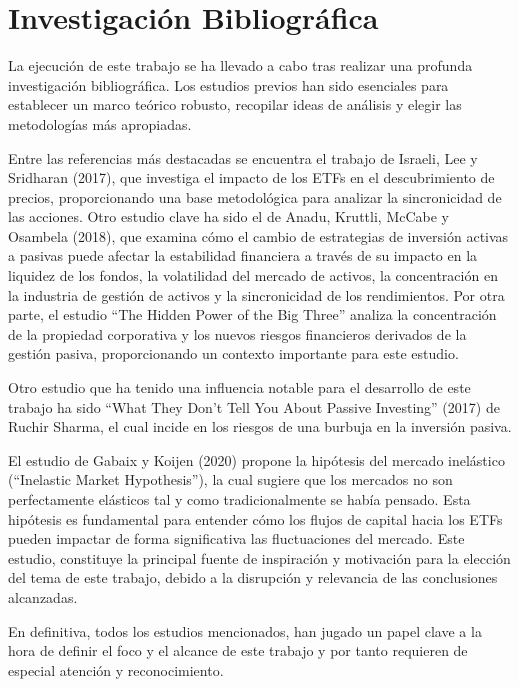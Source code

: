 \documentclass[12pt,a4paper]{article}
\begin{document}
\newpage

\section*{Investigación Bibliográfica}

La ejecución de este trabajo se ha llevado a cabo tras realizar una profunda investigación bibliográfica. Los estudios previos han sido esenciales para establecer un marco teórico robusto, recopilar ideas de análisis y elegir las metodologías más apropiadas.

Entre las referencias más destacadas se encuentra el trabajo de Israeli, Lee y Sridharan (2017), que investiga el impacto de los ETFs en el descubrimiento de precios, proporcionando una base metodológica para analizar la sincronicidad de las acciones. Otro estudio clave ha sido el de Anadu, Kruttli, McCabe y Osambela (2018), que examina cómo el cambio de estrategias de inversión activas a pasivas puede afectar la estabilidad financiera a través de su impacto en la liquidez de los fondos, la volatilidad del mercado de activos, la concentración en la industria de gestión de activos y la sincronicidad de los rendimientos. Por otra parte, el estudio ``The Hidden Power of the Big Three'' analiza la concentración de la propiedad corporativa y los nuevos riesgos financieros derivados de la gestión pasiva, proporcionando un contexto importante para este estudio.

Otro estudio que ha tenido una influencia notable para el desarrollo de este trabajo ha sido ``What They Don't Tell You About Passive Investing'' (2017) de Ruchir Sharma, el cual incide en los riesgos de una burbuja en la inversión pasiva.

El estudio de Gabaix y Koijen (2020) propone la hipótesis del mercado inelástico (``Inelastic Market Hypothesis''), la cual sugiere que los mercados no son perfectamente elásticos tal y como tradicionalmente se había pensado. Esta hipótesis es fundamental para entender cómo los flujos de capital hacia los ETFs pueden impactar de forma significativa las fluctuaciones del mercado. Este estudio, constituye la principal fuente de inspiración y motivación para la elección del tema de este trabajo, debido a la disrupción y relevancia de las conclusiones alcanzadas.

En definitiva, todos los estudios mencionados, han jugado un papel clave a la hora de definir el foco y el alcance de este trabajo y por tanto requieren de especial atención y reconocimiento.
\end{document}
